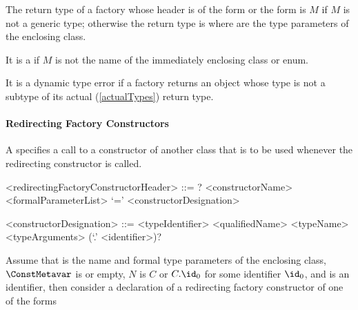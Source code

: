 \documentclass[makeidx]{article}
\begin{document}
\LMHash{}%
The return type of a factory whose header is of
the form  or
the form 
is $M$ if $M$ is not a generic type;
otherwise the return type is
where  are the type parameters of the enclosing class.


\LMHash{}%
It is a  if $M$ is not the name of
the immediately enclosing class or enum.

\LMHash{}%
It is a dynamic type error if a factory returns an object
whose type is not a subtype of its actual
(\ref{actualTypes})
return type.



\paragraph{Redirecting Factory Constructors}

\LMHash{}%
A 
specifies a call to a constructor of another class that is to be used
whenever the redirecting constructor is called.

\begin{grammar}
<redirectingFactoryConstructorHeader> ::= \gnewline{}
  \CONST? \FACTORY{} <constructorName> <formalParameterList> `=' \gnewline{}
  <constructorDesignation>

<constructorDesignation> ::= <typeIdentifier>
  \alt <qualifiedName>
  \alt <typeName> <typeArguments> (`.' <identifier>)?
\end{grammar}

Assume that
%
is the name and formal type parameters of the enclosing class,
%
$\ConstMetavar$ is \CONST{} or empty,
$N$ is $C$ or $C.\id_0$ for some identifier $\id_0$,
and \DefineSymbol{\id} is an identifier,
then consider a declaration of a redirecting factory constructor
 of one of the forms
\end{document}
